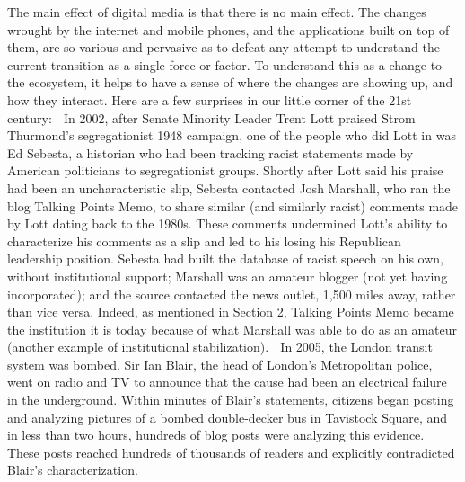The main effect of digital media is that there is no main effect. The changes
wrought by the internet and mobile phones, and the applications built on top
of them, are so various and pervasive as to defeat any attempt to understand the
current transition as a single force or factor. To understand this as a change to
the ecosystem, it helps to have a sense of where the changes are showing up, and
how they interact.
Here are a few surprises in our little corner of the 21st century:
 In 2002, after Senate Minority Leader Trent Lott praised Strom
Thurmond’s segregationist 1948 campaign, one of the people who
did Lott in was Ed Sebesta, a historian who had been tracking racist
statements made by American politicians to segregationist groups.
Shortly after Lott said his praise had been an uncharacteristic slip,
Sebesta contacted Josh Marshall, who ran the blog Talking Points
Memo, to share similar (and similarly racist) comments made by Lott
dating back to the 1980s.
These comments undermined Lott’s ability to characterize his comments
as a slip and led to his losing his Republican leadership position.
Sebesta had built the database of racist speech on his own,
without institutional support; Marshall was an amateur blogger (not
yet having incorporated); and the source contacted the news outlet,
1,500 miles away, rather than vice versa. Indeed, as mentioned in Section
2, Talking Points Memo became the institution it is today because
of what Marshall was able to do as an amateur (another example
of institutional stabilization).
 In 2005, the London transit system was bombed. Sir Ian Blair, the
head of London’s Metropolitan police, went on radio and TV to
announce that the cause had been an electrical failure in the underground.
Within minutes of Blair’s statements, citizens began posting
and analyzing pictures of a bombed double-decker bus in Tavistock
Square, and in less than two hours, hundreds of blog posts were analyzing
this evidence. These posts reached hundreds of thousands of
readers and explicitly contradicted Blair’s characterization.

